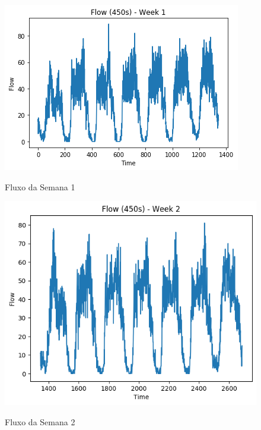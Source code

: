 \label{attachment:flows}

\begin{figure}[h]
    \centering
    \includegraphics[scale=0.9]{monography/img/flows/flow_450_week_01.png}
    \label{figure:flow_450_week_01}
    \caption{Fluxo da Semana 1}
\end{figure}

\begin{figure}[h]
    \centering
    \includegraphics[scale=0.9]{monography/img/flows/flow_450_week_02.png}
    \label{figure:flow_450_week_02}
    \caption{Fluxo da Semana 2}
\end{figure}

